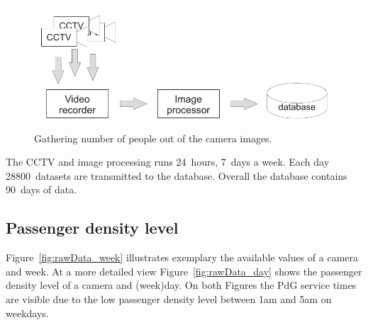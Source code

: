 \begin{figure}[htb]
  \centering
  \includegraphics[width=\linewidth]{Figures/imageProcessing.pdf} 
  \caption{Gathering number of people out of the camera images.}
  \label{fig:CCTVimageProcessing}
\end{figure}

The CCTV and image processing runs 24~hours, 7~days a week. Each day 28800~datasets are transmitted to the database. Overall the database contains 90~days of data.


\subsection{Passenger density level}
\label{subsec:PassengerDensityLevel}

Figure~\ref{fig:rawData_week} illustrates exemplary the available values of a camera and week. At a more detailed view Figure~\ref{fig:rawData_day} shows the passenger density level of a camera and (week)day. On both Figures the PdG service times are visible due to the low passenger density level between 1am and 5am on weekdays.

